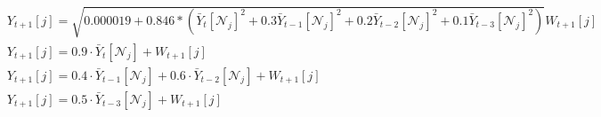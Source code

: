 \begin{table}[!h]
{\begin{minipage}{1.4\linewidth}
\begin{align}
& Y_{t+1}\left[j\right]=\sqrt{0.000019+0.846 *\left(\bar{Y}_t\left[\mathcal{N}_j\right]^2+0.3 \bar{Y}_{t-1}\left[\mathcal{N}_j\right]^2+0.2 \bar{Y}_{t-2}\left[\mathcal{N}_j\right]^2+0.1 \bar{Y}_{t-3}\left[\mathcal{N}_j\right]^2\right)} W_{t+1}\left[j\right]\label{eq:p17}\\ 
& Y_{t+1}\left[j\right] = 0.9 \cdot \bar{Y}_t\left[\mathcal{N}_j\right] + W_{t+1}\left[j\right] \label{eq:p18}\\ 
& Y_{t+1}\left[j\right] = 0.4 \cdot \bar{Y}_{t-1}\left[\mathcal{N}_j\right] + 0.6 \cdot \bar{Y}_{t-2}\left[\mathcal{N}_j\right] + W_{t+1}\left[j\right]\label{eq:p19}\\ 
& Y_{t+1}\left[j\right] = 0.5 \cdot \bar{Y}_{t-3}\left[\mathcal{N}_j\right] + W_{t+1}\left[j\right]\label{eq:p20}\\ 
\end{align}
\end{minipage}
}
\caption{ }
\label{a}
\end{table}

